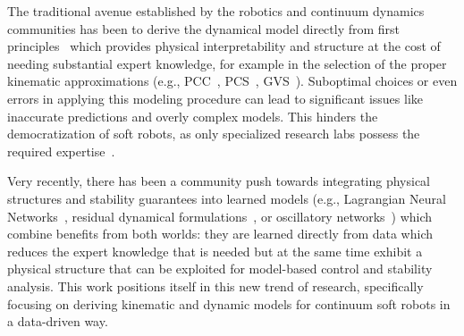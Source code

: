 The traditional avenue established by the robotics and continuum dynamics communities has been to derive the dynamical model directly from first principles~\citep{renda2018discrete, boyer2020dynamics, della2023model, armanini2023soft} %
which provides physical interpretability and structure at the cost of needing substantial expert knowledge, for example in the selection of the proper kinematic approximations (e.g., \gls{PCC}~\citep{webster2010design}, \gls{PCS}~\citep{renda2018discrete}, \gls{GVS}~\citep{boyer2020dynamics}). %
%
Suboptimal choices or even errors in applying this modeling procedure can lead to significant issues like inaccurate predictions and overly complex models. This hinders the democratization of soft robots, as only specialized research labs possess the required expertise~\citep{aracri2024soft}.

Very recently, there has been a community push towards integrating physical structures and stability guarantees into learned models (e.g., Lagrangian Neural Networks~\citep{liu2024physics}, residual dynamical formulations~\citep{bruder2024koopman, gao2024sim}, or oscillatory networks~\citep{stolzle2024input}) which combine benefits from both worlds: they are learned directly from data which reduces the expert knowledge that is needed but at the same time exhibit a physical structure that can be exploited for model-based control and stability analysis.
This work positions itself in this new trend of research, specifically focusing on deriving kinematic and dynamic models for continuum soft robots in a data-driven way.
%
%


